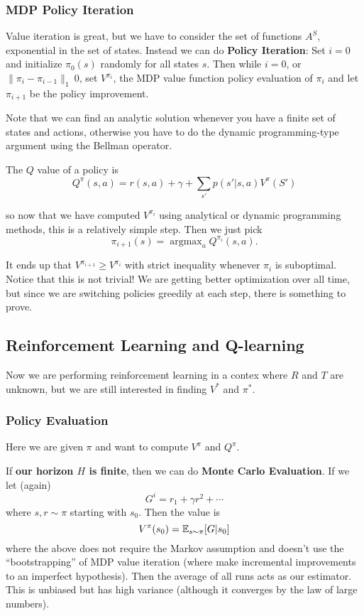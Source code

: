 \documentclass[12pt]{article}
\DeclareMathOperator*{\argmax}{argmax}
\begin{document}
\subsubsection{MDP Policy Iteration}
Value iteration is great, but we have to consider the set of functions $A^S$, exponential in the set of states. Instead we can do \textbf{Policy Iteration}:
Set $i=0$ and initialize $\pi_0(s)$ randomly for all states $s$. Then while $i=0$, or $\|\pi_i-\pi_{i-1}\|_1\>0$, set $V^{\pi_i}$, the MDP
value function policy evaluation of $\pi_i$ and let $\pi_{i+1}$ be the policy improvement.

Note that we can find an analytic solution whenever you have a finite set of states and actions, otherwise you have to do the dynamic programming-type argument using the Bellman operator.
\begin{defn}
	The $Q$ value of a policy is 
	\[Q^\pi(s,a)=r(s,a)+\gamma+\sum_{s'} p(s'|s,a)V^\pi(S')\]
\end{defn}
so now that we have computed $V^{\pi_i}$ using analytical or dynamic programming methods, this is a relatively simple step. Then we just pick
\[\pi_{i+1}(s)=\argmax_aQ^{\pi_i}(s,a).\]

\begin{rmk}
	It ends up that $V^{\pi_{i+1}}\ge V^{\pi_i}$ with strict inequality whenever $\pi_i$ is suboptimal. Notice that this is not trivial! We are getting better optimization over all time, 
	but since we are switching policies greedily at each step, there is something to prove.
\end{rmk}

\subsection{Reinforcement Learning and Q-learning}
Now we are performing reinforcement learning in a contex where $R$ and $T$ are unknown, but we are still interested in finding $V^\ast$ and $\pi^\ast$.

\subsubsection{Policy Evaluation}
Here we are given $\pi$ and want to compute $V^\pi$ and $Q^\pi$.

If \textbf{our horizon $H$ is finite}, then we can do \textbf{Monte Carlo Evaluation}. If we let (again)
\[G^i=r_1+\gamma r^2+\cdots\]
where $s,r\sim \pi$ starting with $s_0$. Then the value is 
\[V^\pi(s_0)=\mathbb{E}_{s\sim \pi}[G|s_0]\]
where the above does not require the Markov assumption and doesn't use the ``bootstrapping'' of MDP value iteration (where make incremental improvements to an imperfect hypothesis).
Then the average of all runs acts as our estimator. This is unbiased but has high variance (although it converges by the law of large numbers).
\end{document}
